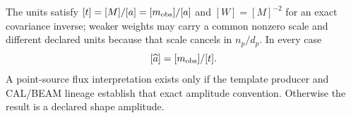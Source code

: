 The units satisfy $[t]=[M]/[a]=[m_{\rm obs}]/[a]$ and
$[W]=[M]^{-2}$ for an exact covariance
inverse; weaker weights may carry a common nonzero scale and different
declared units because that scale cancels in $n_p/d_p$. In every case
\[
 [\widehat a]=[m_{\rm obs}]/[t].
\]
A point-source flux interpretation exists only if the template producer and
CAL/BEAM lineage establish that exact amplitude convention. Otherwise the
result is a declared shape amplitude.
